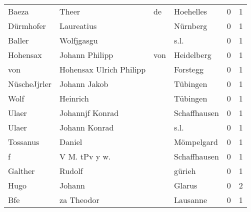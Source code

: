 \begin{tabular}{llllrr}
                    Baeza &                              Theer &          de &                                   Hoehelles &          0 &         1 \\
                Dürmhofer &                         Laureatius &             &                                    Nürnberg &          0 &         1 \\
                   Baller &                         Wolfjgasgu &             &                                        s.l. &          0 &         1 \\
                 Hohensax &                     Johann Philipp &         von &                                  Heidelberg &          0 &         1 \\
                      von &            Hohensax Ulrich Philipp &             &                                    Forstegg &          0 &         1 \\
             NüscheJjrler &                       Johann Jakob &             &                                    Tübingen &          0 &         1 \\
                     Wolf &                           Heinrich &             &                                    Tübingen &          0 &         1 \\
                    Ulaer &                    Johannjf Konrad &             &                                Schaffhausen &          0 &         1 \\
                    Ulaer &                      Johann Konrad &             &                                        s.l. &          0 &         1 \\
                 Tossanus &                             Daniel &             &                                  Mömpelgard &          0 &         1 \\
                        f &                      V M. tPv y w. &             &                                Schaffhausen &          0 &         1 \\
                  Galther &                             Rudolf &             &                                      gürieh &          0 &         1 \\
                     Hugo &                             Johann &             &                                      Glarus &          0 &         2 \\
                      Bfe &                         za Theodor &             &                                    Lausanne &          0 &         1 \\

\end{tabular}
